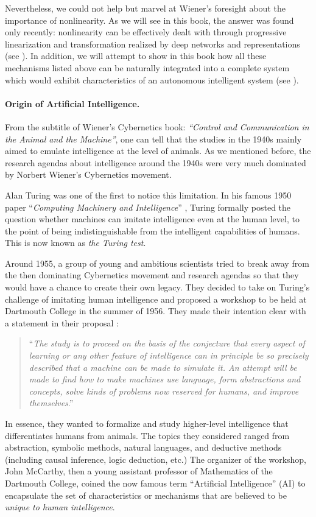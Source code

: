 \documentclass[../../book-main.tex]{subfiles}
\begin{document}
Nevertheless, we could not help but marvel at Wiener's foresight about the importance of nonlinearity. As we will see in this book, the answer was found only recently: nonlinearity can be effectively dealt with through progressive linearization and transformation realized by deep networks and representations (see ). In addition, we will attempt to show in this book how all these mechanisms listed above can be naturally integrated into a complete system which would exhibit characteristics of an autonomous intelligent system (see ). 

\paragraph{Origin of Artificial Intelligence.}
From the subtitle of Wiener's Cybernetics book: {\em ``Control and Communication in the Animal and the Machine''}, one can tell that the studies in the 1940s mainly aimed to emulate intelligence at the level of animals. As we mentioned before, the research agendas about intelligence around the 1940s were very much dominated by Norbert Wiener's Cybernetics movement. 

Alan Turing was one of the first to notice this limitation. In his famous 1950 paper ``{\em Computing Machinery and Intelligence}'' \cite{Turing-1950}, Turing formally posted the question whether machines can imitate intelligence even at the human level, to the point of being indistinguishable from the intelligent capabilities of humans. This is now known as {\em the Turing test}. 

Around 1955, a group of young and ambitious scientists tried to break away from the then dominating Cybernetics movement and research agendas so that they would have a chance to create their own legacy. They decided to take on Turing's challenge of imitating human intelligence and proposed a workshop to be held at Dartmouth College in the summer of 1956. They made their intention clear with a statement in their proposal \cite{McCarthy-1955}: 
\begin{quote}
    ``{\em The study is to proceed on the basis of the conjecture that every aspect of learning or any other feature of intelligence can in principle be so precisely described that a machine can be made to simulate it. An attempt will be made to find how to make machines use language, form abstractions and concepts, solve kinds of problems now reserved for humans, and improve themselves}.'' 
\end{quote}
In essence, they wanted to formalize and study higher-level intelligence that differentiates humans from animals. The topics they considered ranged from abstraction, symbolic methods, natural languages, and deductive methods (including causal inference, logic deduction, etc.) The organizer of the workshop, John McCarthy, then a young assistant professor of Mathematics of the Dartmouth College, coined the now famous term ``Artificial Intelligence'' (AI) to encapsulate the set of characteristics or mechanisms that are believed to be {\em unique to human intelligence}. 
\end{document}
